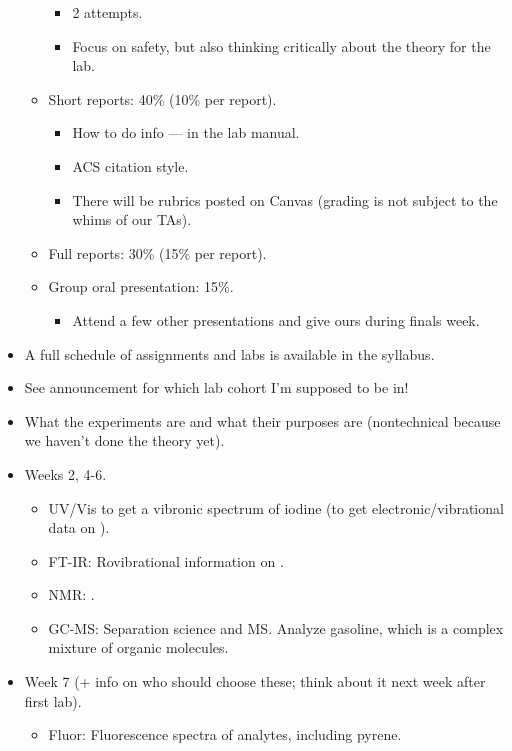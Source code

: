\documentclass[../notes.tex]{subfiles}
\begin{document}
\begin{itemize}
\begin{itemize}
\begin{itemize}
            \item 2 attempts.
            \item Focus on safety, but also thinking critically about the theory for the lab.
        \end{itemize}
        \item Short reports: 40\% (10\% per report).
        \begin{itemize}
            \item How to do info --- in the lab manual.
            \item ACS citation style.
            \item There will be rubrics posted on Canvas (grading is not subject to the whims of our TAs).
        \end{itemize}
        \item Full reports: 30\% (15\% per report).
        \item Group oral presentation: 15\%.
        \begin{itemize}
            \item Attend a few other presentations and give ours during finals week.
        \end{itemize}
    \end{itemize}
    \item A full schedule of assignments and labs is available in the syllabus.
    \item See announcement for which lab cohort I'm supposed to be in!
    \item What the experiments are and what their purposes are (nontechnical because we haven't done the theory yet).
    \item Weeks 2, 4-6.
    \begin{itemize}
        \item UV/Vis to get a vibronic spectrum of iodine (to get electronic/vibrational data on ).
        \item FT-IR: Rovibrational information on .
        \item NMR: .
        \item GC-MS: Separation science and MS. Analyze gasoline, which is a complex mixture of organic molecules.
    \end{itemize}
    \item Week 7 (+ info on who should choose these; think about it next week after first lab).
    \begin{itemize}
        \item Fluor: Fluorescence spectra of analytes, including pyrene.

\end{itemize}
\end{itemize}
\end{document}
